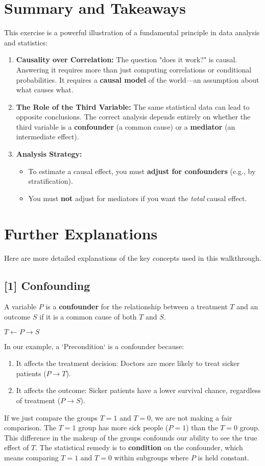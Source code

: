 \documentclass[11pt,a4paper]{article}
\begin{document}
\section{Summary and Takeaways}
This exercise is a powerful illustration of a fundamental principle in data analysis and statistics:
\begin{enumerate}
    \item \textbf{Causality over Correlation:} The question "does it work?" is causal. Answering it requires more than just computing correlations or conditional probabilities. It requires a \textbf{causal model} of the world—an assumption about what causes what.
    \item \textbf{The Role of the Third Variable:} The same statistical data can lead to opposite conclusions. The correct analysis depends entirely on whether the third variable is a \textbf{confounder} (a common cause) or a \textbf{mediator} (an intermediate effect).
    \item \textbf{Analysis Strategy:}
    \begin{itemize}
        \item To estimate a causal effect, you must \textbf{adjust for confounders} (e.g., by stratification).
        \item You must \textbf{not} adjust for mediators if you want the \textit{total} causal effect.
    \end{itemize}
\end{enumerate}


\newpage
\appendix
\section{Further Explanations}
Here are more detailed explanations of the key concepts used in this walkthrough.

\subsection{[1] Confounding}\label{sec:confounding}
A variable $P$ is a \textbf{confounder} for the relationship between a treatment $T$ and an outcome $S$ if it is a common cause of both $T$ and $S$.
\begin{center}
    $T \leftarrow P \to S$
\end{center}
In our example, a `Precondition` is a confounder because:
\begin{enumerate}
    \item It affects the treatment decision: Doctors are more likely to treat sicker patients ($P \to T$).
    \item It affects the outcome: Sicker patients have a lower survival chance, regardless of treatment ($P \to S$).
\end{enumerate}
If we just compare the groups $T=1$ and $T=0$, we are not making a fair comparison. The $T=1$ group has more sick people ($P=1$) than the $T=0$ group. This difference in the makeup of the groups confounds our ability to see the true effect of $T$. The statistical remedy is to \textbf{condition} on the confounder, which means comparing $T=1$ and $T=0$ within subgroups where $P$ is held constant.
\end{document}

